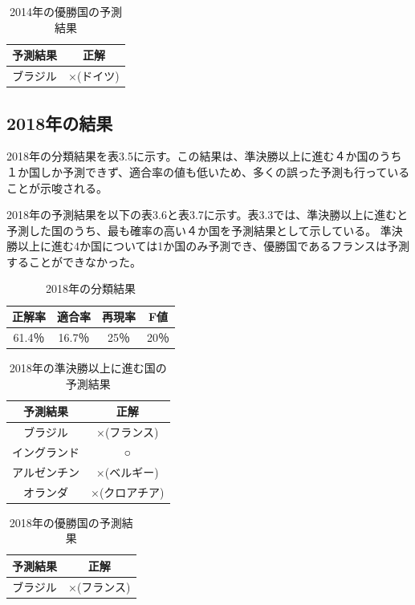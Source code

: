 \documentclass[platex]{suribt}
\begin{document}
\begin{table}[h]
  \centering
  \begin{tabular}{|c|c|}
    \hline
    予測結果 & 正解 \\ \hline
    ブラジル & ×(ドイツ) \\ \hline
  \end{tabular}
  \caption{2014年の優勝国の予測結果}
\end{table}

\subsection{2018年の結果}
2018年の分類結果を表3.5に示す。この結果は、準決勝以上に進む４か国のうち１か国しか予測できず、適合率の値も低いため、多くの誤った予測も行っていることが示唆される。

2018年の予測結果を以下の表3.6と表3.7に示す。表3.3では、準決勝以上に進むと予測した国のうち、最も確率の高い４か国を予測結果として示している。
準決勝以上に進む4か国については1か国のみ予測でき、優勝国であるフランスは予測することができなかった。

\begin{table}[h]
  \centering
  \begin{tabular}{|c|c|c|c|}
    \hline
    正解率 & 適合率 & 再現率 & F値 \\ \hline
    61.4％ & 16.7％ & 25％ & 20％ \\ \hline
  \end{tabular}
  \caption{2018年の分類結果}
\end{table}

\begin{table}[h]
  \centering
  \begin{tabular}{|c|c|}
    \hline
    予測結果 & 正解 \\ \hline
    ブラジル &  ×(フランス)\\ \hline
    イングランド &  ○ \\ \hline
    アルゼンチン & ×(ベルギー) \\ \hline
    オランダ & ×(クロアチア) \\ \hline
  \end{tabular}
  \caption{2018年の準決勝以上に進む国の予測結果}
\end{table}

\begin{table}[h]
  \centering
  \begin{tabular}{|c|c|}
    \hline
    予測結果 & 正解 \\ \hline
    ブラジル & ×(フランス) \\ \hline
  \end{tabular}
  \caption{2018年の優勝国の予測結果}
\end{table}
\end{document}
